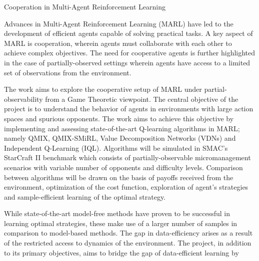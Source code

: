 \documentclass[10pt,letterpaper]{article}
\begin{document}
\begin{center}
  \large{Cooperation in Multi-Agent Reinforcement Learning}
\end{center}

Advances in Multi-Agent Reinforcement Learning (MARL) have led to the development of efficient agents capable of solving practical tasks. A key aspect of MARL is cooperation, wherein agents must collaborate with each other to achieve complex objectives. The need for cooperative agents is further highlighted in the case of partially-observed settings wherein agents have access to a limited set of observations from the environment.

The work aims to explore the cooperative setup of MARL under partial-observability from a Game Theoretic viewpoint. The central objective of the project is to understand the behavior of agents in environments with large action spaces and spurious opponents. The work aims to achieve this objective by implementing and assessing state-of-the-art Q-learning algorithms in MARL; namely QMIX, QMIX-SMiRL, Value Decomposition Networks (VDNs) and Independent Q-Learning (IQL). Algorithms will be simulated in SMAC's StarCraft II benchmark which consists of partially-observable micromanagement scenarios with variable number of opponents and difficulty levels. Comparison between algorithms will be drawn on the basis of payoffs received from the environment, optimization of the cost function, exploration of agent's strategies and sample-efficient learning of the optimal strategy.

While state-of-the-art model-free methods have proven to be successful in learning optimal strategies, these make use of a larger number of samples in comparison to model-based methods. The gap in data-efficiency arises as a result of the restricted access to dynamics of the environment. The project, in addition to its primary objectives, aims to bridge the gap of data-efficient learning by 


\small{}
\end{document}
